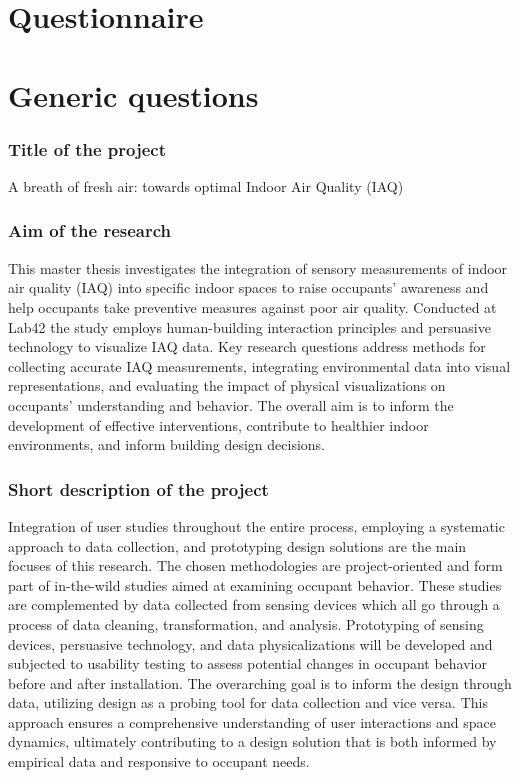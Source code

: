 \documentclass[a4paper]{article}
\begin{document}
\section*{Questionnaire}

\section{Generic questions}

\subsubsection{Title of the project}

A breath of fresh air: towards optimal Indoor Air Quality (IAQ)

\subsubsection{Aim of the research}

This master thesis investigates the integration of sensory measurements of indoor air quality (IAQ) into specific indoor spaces to raise occupants’ awareness and help occupants take preventive measures against poor air quality. Conducted at Lab42 the study employs human-building interaction principles and persuasive technology to visualize IAQ data. Key research questions address methods for collecting accurate IAQ measurements, integrating environmental data into visual representations, and evaluating the impact of physical visualizations on occupants’ understanding and behavior. The overall aim is to inform the development of effective interventions, contribute to healthier indoor environments, and inform building design decisions.

\subsubsection{Short description of the project}

Integration of user studies throughout the entire process, employing a systematic approach to data collection, and prototyping design solutions are the main focuses of this research. The chosen methodologies are project-oriented and form part of in-the-wild studies aimed at examining occupant behavior. These studies are complemented by data collected from sensing devices which all go through a process of data cleaning, transformation, and analysis. Prototyping of sensing devices, persuasive technology, and data physicalizations will be developed and subjected to usability testing to assess potential changes in occupant behavior before and after installation. The overarching goal is to inform the design through data, utilizing design as a probing tool for data collection and vice versa. This approach ensures a comprehensive understanding of user interactions and space dynamics, ultimately contributing to a design solution that is both informed by empirical data and responsive to occupant needs.
\end{document}
